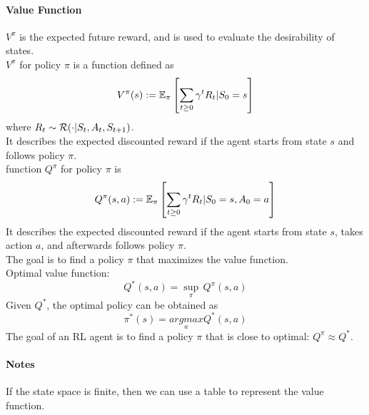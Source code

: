 \documentclass[11pt]{article}
\begin{document}
\paragraph{Value Function}
 $V^\pi$ is the expected future reward, and is used to evaluate the desirability of states. \\
 $V^\pi$ for policy $\pi$ is a function defined as
$$V^{\pi}(s) := \mathbb{E}_\pi\left[ \sum_{t \geq 0} \gamma^t R_t | S_0=s \right ]$$ where $R_t \sim \mathcal{R}(\cdot | S_t, A_t, S_{t+1})$.\\
It describes the expected discounted reward if the agent starts from state $s$ and follows policy $\pi$.\\
 function $Q^\pi$ for policy $\pi$ is 
$$Q^\pi(s,a) := \mathbb{E}_\pi\left[ \sum_{t \geq 0} \gamma^tR_t | S_0=s, A_0 = a\right ]$$
It describes the expected discounted reward if the agent starts from state $s$, takes action $a$, and afterwards follows policy $\pi$. \\
The goal is to find a policy $\pi$ that maximizes the value function. \\
Optimal value function:
$$Q^*(s,a) = \underset{\pi}{\sup} \, Q^\pi (s,a)$$
Given $Q^*$, the optimal policy can be obtained as 
$$\pi^*(s) = \underset{a}{argmax}Q^*(s,a)$$
The goal of an RL agent is to find a policy $\pi$ that is close to optimal: $Q^\pi \approx Q^*$.

\paragraph{Notes}
If the state space is finite, then we can use a table to represent the value function.
\end{document}

